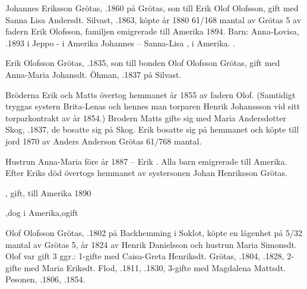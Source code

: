 Johannes Eriksson Grötas, .1860 på Grötas, son till Erik Olof Olofsson, gift med Sanna Lisa Andersdt. Silvast, .1863, köpte år 1880 61/168 mantal av Grötas 5 av fadern Erik Olofsson,  familjen emigrerade till Amerika 1894.
Barn: Anna-Lovisa, .1893 i Jeppo -  i Amerika
Johannes   --  Sanna-Lisa , i Amerika.
                          .

Erik Olofsson Grötas, .1835, son till bonden Olof Olofsson Grötas, gift med Anna-Maria Johansdt. Öhman, .1837 på Silvast.

Bröderna Erik och Matts övertog hemmanet år 1855 av fadern Olof. (Samtidigt tryggas systern Brita-Lenas och hennes man torparen Henrik Johanssson vid sitt torparkontrakt av år 1854.) Brodern Matts gifte sig med Maria Andersdotter Skog, .1837, de bosatte sig på Skog. Erik bosatte sig på hemmanet och köpte till jord 1870 av Anders Anderson Grötas 61/768 mantal.

Hustrun Anna-Maria \textdied före år 1887  --  Erik . Alla barn emigrerade till Amerika. Efter Eriks död övertogs hemmanet av systersonen Johan Henriksson Grötas.
\begin{jhchildren}
  \item {}
  \item {}
  \item {}
  \item {}, gift, till Amerika 1890
  \item {}
  \item {}
  \item {},dog i Amerika,ogift
\end{jhchildren}


Olof Olofsson Grötas, .1802 på Backhemming i Soklot, köpte en lägenhet på 5/32 mantal av Grötas 5, år 1824 av Henrik Danielsson och hustrun Maria Simonsdt. Olof var gift 3 ggr.: 1-gifte med Caisa-Greta Henriksdt. Grötas, .1804, .1828, 2-gifte med Maria Eriksdt. Flod, .1811, .1830, 3-gifte med Magdalena Mattsdt. Pesonen, .1806, .1854.

